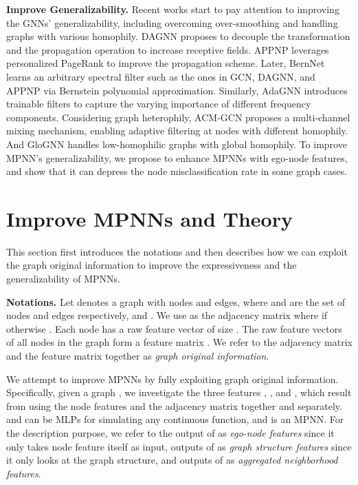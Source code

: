 \documentclass{article}
\theoremstyle{plain}
\begin{document}
\textbf{Improve Generalizability.}
Recent works start to pay attention to improving the GNNs' generalizability, including overcoming over-smoothing and handling graphs with various homophily.
DAGNN \cite{liu2020towards}  proposes to decouple the transformation and the propagation operation to increase receptive fields.
APPNP \cite{klicpera2018predict} leverages personalized PageRank to improve the propagation scheme.
Later, BernNet \cite{he2021bernnet} learns an arbitrary spectral filter such as the ones in GCN, DAGNN, and APPNP via Bernstein polynomial approximation.
Similarly, AdaGNN \cite{dong2021adagnn} introduces trainable filters to capture the varying importance of different frequency components.
Considering graph heterophily, ACM-GCN \cite{luan2022revisiting} proposes a multi-channel mixing mechanism, enabling adaptive filtering at nodes with different homophily.
And GloGNN \cite{li2022finding} handles low-homophilic graphs with global homophily.
To improve MPNN's generalizability, we propose to enhance MPNNs with ego-node features, and show that it can depress the node misclassification rate in some graph cases.




\section{Improve MPNNs and Theory} \label{sec:theory}
This section first introduces the notations and then describes how we can exploit the graph original information to improve the expressiveness and the generalizability of MPNNs. 

\textbf{Notations.}
Let  denotes a graph with  nodes and  edges, where  and  are the set of nodes and edges respectively,  and . 
We use  as the adjacency matrix where  if  otherwise . 
Each node  has a raw feature vector  of size . 
The raw feature vectors of all nodes in the graph form a feature matrix . We refer to the adjacency matrix  and the feature matrix  together as \textit{graph original information}. 






We attempt to improve MPNNs by fully exploiting graph original information. 
Specifically, given a graph , we investigate the three features , , and , which result from using the node features  and the adjacency matrix  together and separately. 
 and  can be MLPs for simulating any continuous function, and  is an MPNN.
For the description purpose, we refer to the output of  as \textit{ego-node features} since it only takes node feature itself as input, outputs of  as \textit{graph structure features} since it only looks at the graph structure, and outputs of  as \textit{aggregated neighborhood features}. 
\end{document}

